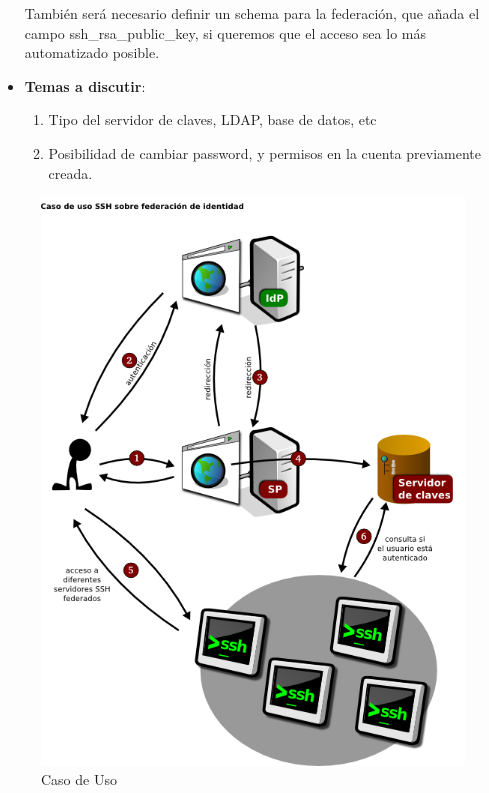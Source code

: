 \begin{itemize}
    También será necesario definir un schema para la federación, que añada
    el campo ssh\_rsa\_public\_key, si queremos que el acceso sea lo más
    automatizado posible.

    \item \textbf{Temas a discutir}:

    \begin{enumerate}
        \item Tipo del servidor de claves, LDAP, base de datos, etc

        \item Posibilidad de cambiar password, y permisos en la cuenta previamente creada.
    \end{enumerate}

    \end{itemize}

    \begin{figure}[htp!]
        \centering
            \includegraphics[width=\textwidth]{img/casodeuso1.png}
            \caption{Caso de Uso}
        \label{fig:casodeuso}
    \end{figure}

